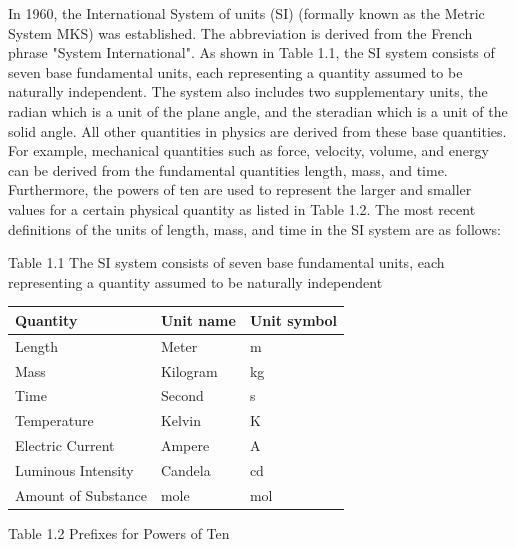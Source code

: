\documentclass[10pt]{article}
\begin{document}
In 1960, the International System of units (SI) (formally known as the Metric System MKS) was established. The abbreviation is derived from the French phrase "System International". As shown in Table 1.1, the SI system consists of seven base fundamental units, each representing a quantity assumed to be naturally independent. The system also includes two supplementary units, the radian which is a unit of the plane angle, and the steradian which is a unit of the solid angle. All other quantities in physics are derived from these base quantities. For example, mechanical quantities such as force, velocity, volume, and energy can be derived from the fundamental quantities length, mass, and time. Furthermore, the powers of ten are used to represent the larger and smaller values for a certain physical quantity as listed in Table 1.2. The most recent definitions of the units of length, mass, and time in the SI system are as follows:

Table 1.1 The SI system consists of seven base fundamental units, each representing a quantity assumed to be naturally independent

\begin{center}
\begin{tabular}{l|l|l}
\hline
Quantity & Unit name & Unit symbol \\
\hline
Length & Meter & m \\
\hline
Mass & Kilogram & kg \\
\hline
Time & Second & s \\
\hline
Temperature & Kelvin & K \\
\hline
Electric Current & Ampere & A \\
\hline
Luminous Intensity & Candela & cd \\
\hline
Amount of Substance & mole & mol \\
\hline
\end{tabular}
\end{center}

Table 1.2 Prefixes for Powers of Ten
\end{document}
